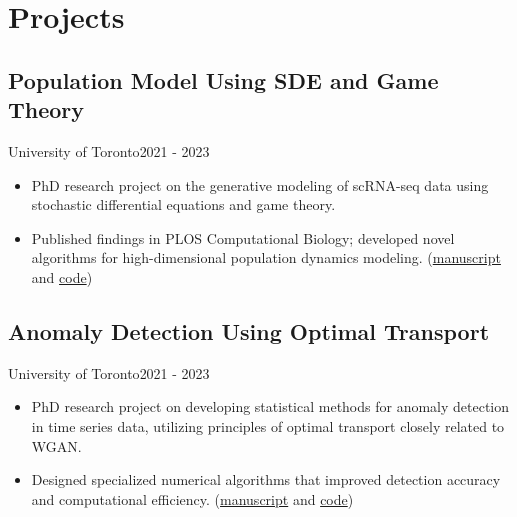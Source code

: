 \section{Projects}
\subsection{Population Model Using SDE and Game Theory}{University of Toronto}{2021 - 2023}
\begin{itemize}[leftmargin=*]
    \item PhD research project on the generative modeling of scRNA-seq data using stochastic differential equations and game theory.
    \item Published findings in PLOS Computational Biology; developed novel algorithms for high-dimensional population dynamics modeling. (\href{https://github.com/Diebrate/population_model}{manuscript} and \href{https://journals.plos.org/ploscompbiol/article?id=10.1371/journal.pcbi.1012015}{code})
\end{itemize}

\subsection{Anomaly Detection Using Optimal Transport}{University of Toronto}{2021 - 2023}
\begin{itemize}[leftmargin=*]
    \item PhD research project on developing statistical methods for anomaly detection in time series data, utilizing principles of optimal transport closely related to WGAN.
    \item Designed specialized numerical algorithms that improved detection accuracy and computational efficiency. (\href{https://arxiv.org/abs/2501.03501}{manuscript} and \href{https://github.com/Diebrate/scRNA_study}{code})
\end{itemize}
